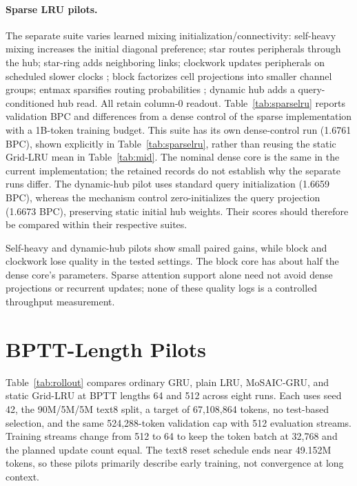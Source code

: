 \documentclass[letterpaper,twoside]{article}
\begin{document}
\paragraph{Sparse LRU pilots.}
The separate suite varies learned mixing initialization/connectivity: self-heavy mixing increases the initial diagonal preference; star routes peripherals through the hub; star-ring adds neighboring links; clockwork updates peripherals on scheduled slower clocks \citep{koutnik2014clockwork}; block factorizes cell projections into smaller channel groups; entmax sparsifies routing probabilities \citep{peters2019entmax}; dynamic hub adds a query-conditioned hub read. All retain column-0 readout. Table~\ref{tab:sparselru} reports validation BPC and differences from a dense control of the sparse implementation with a 1B-token training budget. This suite has its own dense-control run (1.6761 BPC), shown explicitly in Table~\ref{tab:sparselru}, rather than reusing the static Grid-LRU mean in Table~\ref{tab:mid}. The nominal dense core is the same in the current implementation; the retained records do not establish why the separate runs differ. The dynamic-hub pilot uses standard query initialization (1.6659 BPC), whereas the mechanism control zero-initializes the query projection (1.6673 BPC), preserving static initial hub weights. Their scores should therefore be compared within their respective suites.



Self-heavy and dynamic-hub pilots show small paired gains, while block and clockwork lose quality in the tested settings. The block core has about half the dense core's parameters. Sparse attention support alone need not avoid dense projections or recurrent updates; none of these quality logs is a controlled throughput measurement.

\section{BPTT-Length Pilots}\label{app:rollout}

Table~\ref{tab:rollout} compares ordinary GRU, plain LRU, MoSAIC-GRU, and static Grid-LRU at BPTT lengths 64 and 512 across eight runs. Each uses seed 42, the 90M/5M/5M text8 split, a target of 67,108,864 tokens, no test-based selection, and the same 524,288-token validation cap with 512 evaluation streams. Training streams change from 512 to 64 to keep the token batch at 32,768 and the planned update count equal. The text8 reset schedule ends near 49.152M tokens, so these pilots primarily describe early training, not convergence at long context.
\end{document}
